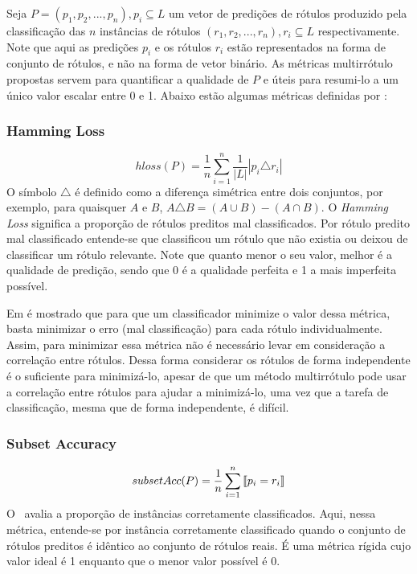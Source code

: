 Seja $P=(p_1,p_2,...,p_n), p_i \subseteq L$
um vetor de predições de rótulos produzido pela
classificação das $n$ instâncias de rótulos $(r_1,r_2,...,r_n), r_i \subseteq L$
respectivamente. Note que aqui as predições $p_i$ e os rótulos $r_i$ estão representados na forma de conjunto de rótulos,
e não na forma de vetor binário.
As métricas multirrótulo propostas servem para quantificar a qualidade de $P$
e úteis para resumi-lo a um único valor escalar entre 0 e 1.
Abaixo estão algumas métricas definidas por \cite{reviewml2013}:

\subsubsection{Hamming Loss}
\begin{equation}
 hloss(P)=\frac{1}{n} \sum_{i=1}^n{\frac{1}{|L|}|p_i \triangle r_i|}
\end{equation}
O símbolo $\triangle$ é definido como a diferença simétrica entre dois conjuntos, por exemplo, 
para quaisquer $A$ e $B$, $A \triangle B=(A \cup B) - (A \cap B)$.
O \textit{Hamming Loss} significa a proporção de rótulos preditos mal classificados. Por rótulo predito mal classificado
entende-se que classificou um rótulo que não existia ou deixou de classificar um rótulo relevante.
Note que quanto menor o seu valor, melhor é a qualidade de predição, sendo que 0 é a qualidade perfeita e 1 a mais
imperfeita possível.

Em \cite{pcc2010} é mostrado que para que um classificador minimize o valor dessa métrica, basta minimizar
o erro (mal classificação) para cada rótulo individualmente. 
Assim, para minimizar essa métrica não é necessário levar
em consideração a correlação entre rótulos. Dessa forma considerar os rótulos de forma independente é o suficiente para minimizá-lo,
apesar de que um método multirrótulo pode usar a correlação entre rótulos para ajudar a minimizá-lo, uma vez que 
a tarefa de classificação, mesma que de forma independente, é difícil.

\subsubsection{Subset Accuracy}
\begin{equation}
 subsetAcc(P)=\frac{1}{n} \sum_{i=1}^n{\text{\textlbrackdbl} p_i = r_i \text{\textrbrackdbl}}
\end{equation}
O \SA~avalia a proporção de instâncias corretamente classificados. Aqui, nessa métrica, 
entende-se por instância corretamente classificado quando o conjunto de rótulos preditos é
idêntico ao conjunto de rótulos reais. É uma métrica rígida cujo valor ideal é 1 enquanto
que o menor valor possível é 0.

